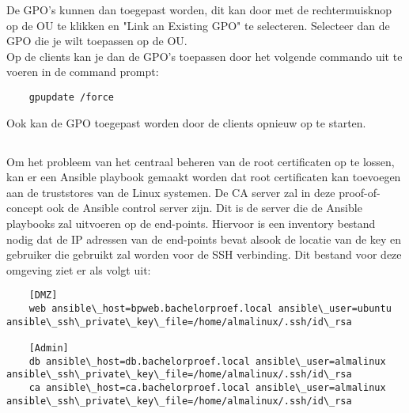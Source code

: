 De GPO's kunnen dan toegepast worden, dit kan door met de rechtermuisknop op de OU te klikken en "Link an Existing GPO" te selecteren. Selecteer dan de GPO die je wilt toepassen op de OU. \\

Op de clients kan je dan de GPO's toepassen door het volgende commando uit te voeren in de command prompt:
\begin{verbatim}
    gpupdate /force
\end{verbatim}
Ook kan de GPO toegepast worden door de clients opnieuw op te starten. \\

\subsection{}
\label{subsec:Oplossing_voor_Linux_end-points_met_Ansible}
Om het probleem van het centraal beheren van de root certificaten op te lossen, kan er een Ansible playbook gemaakt worden dat root certificaten kan toevoegen aan de truststores van de Linux systemen.
De CA server zal in deze proof-of-concept ook de Ansible control server zijn. Dit is de server die de Ansible playbooks zal uitvoeren op de end-points.
Hiervoor is een inventory bestand nodig dat de IP adressen van de end-points bevat alsook de locatie van de key en gebruiker die gebruikt zal worden voor de SSH verbinding. Dit bestand voor deze omgeving ziet er als volgt uit:
\begin{verbatim}
    [DMZ]
    web ansible\_host=bpweb.bachelorproef.local ansible\_user=ubuntu ansible\_ssh\_private\_key\_file=/home/almalinux/.ssh/id\_rsa

    [Admin]
    db ansible\_host=db.bachelorproef.local ansible\_user=almalinux ansible\_ssh\_private\_key\_file=/home/almalinux/.ssh/id\_rsa
    ca ansible\_host=ca.bachelorproef.local ansible\_user=almalinux ansible\_ssh\_private\_key\_file=/home/almalinux/.ssh/id\_rsa
\end{verbatim}

